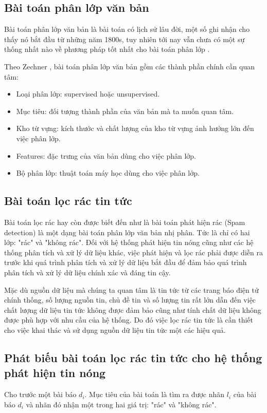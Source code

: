 	\subsection{Bài toán phân lớp văn bản}
  Bài toán phân lớp văn bản là bài toán có lịch sử lâu đời, một số ghi nhận cho thấy nó bắt đầu từ những năm 1800s, tuy nhiên tới nay vẫn chưa có một sự thống nhất nào về phương pháp tốt nhất cho bài toán phân lớp \cite{zechner:history}. 
  
	Theo Zechner \cite{zechner:history}, bài toán phân lớp văn bản gồm các thành phần chính cần quan tâm: 
		\begin{itemize}
			\item Loại phân lớp: supervised hoặc unsupervised.
			\item Mục tiêu: đối tượng thành phần của văn bản mà ta muốn quan tâm.
			\item Kho từ vựng: kích thước và chất lượng của kho từ vựng ảnh hưởng lớn đến việc phân lớp.
			\item Features: đặc trưng của văn bản dùng cho việc phân lớp.
			\item Bộ phân lớp: thuật toán máy học dùng cho việc phân lớp.
		\end{itemize}

	\subsection{Bài toán lọc rác tin tức}
  Bài toán lọc rác hay còn được biết đến như là bài toán phát hiện rác (Spam detection) là một dạng bài toán phân lớp văn bản nhị phân. Tức là chỉ có hai lớp: "rác" và "không rác". Đối với hệ thống phát hiện tin nóng cũng như các hệ thống phân tích và xữ lý dữ liệu khác, việc phát hiện và lọc rác phải được diễn ra trước khi quá trình phân tích và xử lý dữ liệu bắt đầu để đảm bảo quá trình phân tích và xử lý dữ liệu chính xác và đáng tin cậy.

  Mặc dù nguồn dữ liệu mà chúng ta quan tâm là tin tức từ các trang báo điện tử chính thống, số lượng nguồn tin, chủ đề tin và số lượng tin rất lớn dẫn đến việc chất lượng dữ liệu tin tức không được đảm bảo cũng như tính chất dữ liệu không được phù hợp với nhu cầu của hệ thống. Do đó việc lọc rác tin tức là cần thiết cho việc khai thác và sử dụng nguồn dữ liệu tin tức một các hiệu quả.

  \subsection{Phát biếu bài toán lọc rác tin tức cho hệ thống phát hiện tin nóng}
  Cho trước một bài báo $d_i$. Mục tiêu của bài toán là tìm ra được nhãn $l_i$ của bài báo $d_i$ và nhãn đó nhận một trong hai giá trị: "rác" và "không rác".
	
